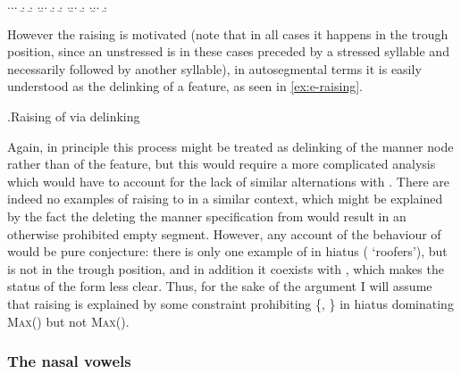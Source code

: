\ex.\a.\a.
\b.
\b.
\z.\b.\a.
\b.
\b.
\z.\b.\a.
\b.
\z.\b.\a.
\b.


However the raising is motivated (note that in all cases it happens in the trough position, since an unstressed \ipa{[e]} is in these cases preceded by a stressed syllable and necessarily followed by another syllable), in autosegmental terms it is easily understood as the delinking of a  feature, as seen in \cref{ex:e-raising}.

\ex.\label{ex:e-raising}Raising of \ipa{[e]} via delinking\\

Again, in principle this process might be treated as delinking of the manner node rather than of the feature, but this would require a more complicated analysis which would have to account for the lack of similar alternations with \ipa{[o]}. There are indeed no examples of \ipa{[o]} raising to \ipa{[u]} in a similar context, which might be explained by the fact the deleting the manner specification from \ipa{[o]} would result in an otherwise prohibited empty segment. However, any account of the behaviour of \ipa{[o]} would be pure conjecture: there is only one example of \ipa{[o]} in hiatus (\ipa{[toˈærjən]} `roofers'), but \ipa{[o]} is not in the trough position, and in addition it coexists with \ipa{[ˈtoːərjən]}, which makes the status of the form less clear. Thus, for the sake of the argument I will assume that raising is explained by some constraint prohibiting \{, \} in hiatus dominating \textsc{Max}() but not \textsc{Max}().

\subsubsection{The nasal vowels}
\label{sec:nasal-vowels-1}

